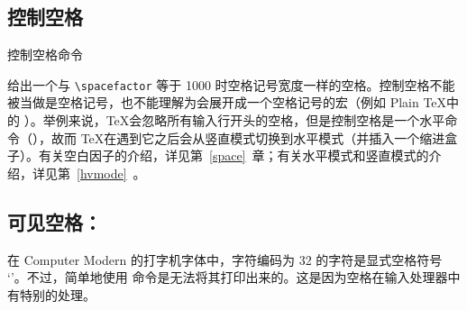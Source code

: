 \documentclass{book}
\begin{document}
\subsection{控制空格}

控制空格命令 \n{\cs{\textvisiblespace}}\cstoidx{}\par 给出一个与 \verb=\spacefactor= 等于 1000 时空格记号宽度一样的空格。控制空格不能被当做是空格记号，也不能理解为会展开成一个空格记号的宏（例如 Plain \TeX 中的 ）。举例来说，\TeX 会忽略所有输入行开头的空格，但是控制空格是一个水平命令（），故而 \TeX 在遇到它之后会从竖直模式切换到水平模式（并插入一个缩进盒子）。有关空白因子的介绍，详见第~\ref{space}~章；有关水平模式和竖直模式的介绍，详见第~\ref{hvmode}~。

\subsection{可见空格：\textvisiblespace}

在 Computer Modern 的打字机字体中，字符编码为 32 的字符是显式空格符号 `\textvisiblespace'。不过，简单地使用  命令是无法将其打印出来的。这是因为空格在输入处理器中有特别的处理。
\end{document}
